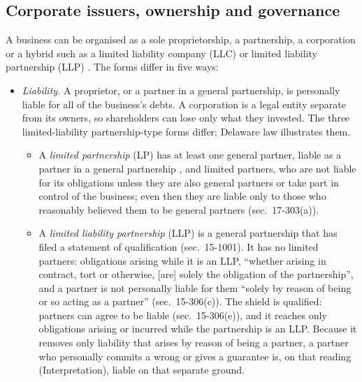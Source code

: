 \subsection{Corporate issuers, ownership and governance}

\begin{qfdefinition}\label{def:organisational-forms-issuers}
 A business can be organised as a sole proprietorship, a partnership, a corporation or a hybrid such as a limited liability company (LLC) or limited liability partnership (LLP) \citep[sec.~2.1]{principles-of-finance-2026}. The forms differ in five ways:
\begin{itemize}
\item \emph{Liability.} A proprietor, or a partner in a general partnership, is personally liable for all of the business's debts. A corporation is a legal entity separate from its owners, so shareholders can lose only what they invested. The three limited-liability partnership-type forms differ; Delaware law illustrates them.
\begin{itemize}
\item A \emph{limited partnership} (LP) has at least one general partner, liable as a partner in a general partnership \citep[sec.~17-403(b)]{delaware-partnership-llc-2026}, and limited partners, who are not liable for its obligations unless they are also general partners or take part in control of the business; even then they are liable only to those who reasonably believed them to be general partners (sec.~17-303(a)).
\item A \emph{limited liability partnership} (LLP) is a general partnership that has filed a statement of qualification (sec.~15-1001). It has no limited partners: obligations arising while it is an LLP, ``whether arising in contract, tort or otherwise, [are] solely the obligation of the partnership'', and a partner is not personally liable for them ``solely by reason of being or so acting as a partner'' (sec.~15-306(c)). The shield is qualified: partners can agree to be liable (sec.~15-306(e)), and it reaches only obligations arising or incurred while the partnership is an LLP. Because it removes only liability that arises by reason of being a partner, a partner who personally commits a wrong or gives a guarantee is, on that reading (Interpretation), liable on that separate ground.

\end{itemize}
\end{itemize}
\end{qfdefinition}
